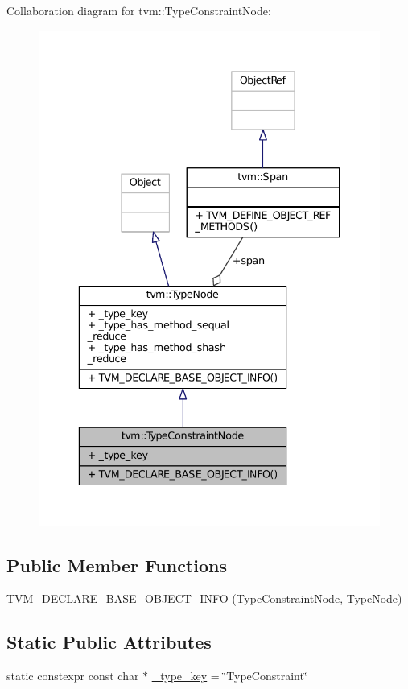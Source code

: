 Collaboration diagram for tvm\+:\+:Type\+Constraint\+Node\+:
\nopagebreak
\begin{figure}[H]
\begin{center}
\leavevmode
\includegraphics[width=336pt]{classtvm_1_1TypeConstraintNode__coll__graph}
\end{center}
\end{figure}
\subsection*{Public Member Functions}
\begin{DoxyCompactItemize}
\item 
\hyperlink{classtvm_1_1TypeConstraintNode_aac087c4b1a1e965939804f21956e1b95}{T\+V\+M\+\_\+\+D\+E\+C\+L\+A\+R\+E\+\_\+\+B\+A\+S\+E\+\_\+\+O\+B\+J\+E\+C\+T\+\_\+\+I\+N\+FO} (\hyperlink{classtvm_1_1TypeConstraintNode}{Type\+Constraint\+Node}, \hyperlink{classtvm_1_1TypeNode}{Type\+Node})
\end{DoxyCompactItemize}
\subsection*{Static Public Attributes}
\begin{DoxyCompactItemize}
\item 
static constexpr const char $\ast$ \hyperlink{classtvm_1_1TypeConstraintNode_aed820653ee31d04087f9347c207c1b13}{\+\_\+type\+\_\+key} = \char`\"{}Type\+Constraint\char`\"{}
\end{DoxyCompactItemize}
